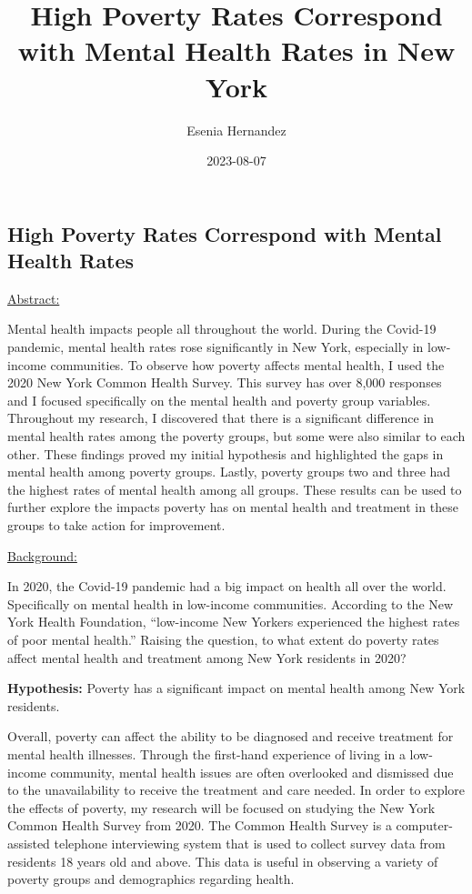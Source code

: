 \documentclass[
]{article}
\title{High Poverty Rates Correspond with Mental Health Rates in New
York}
\author{Esenia Hernandez}
\date{2023-08-07}
\begin{document}
\maketitle

\hypertarget{high-poverty-rates-correspond-with-mental-health-rates}{%
\subsection{High Poverty Rates Correspond with Mental Health
Rates}\label{high-poverty-rates-correspond-with-mental-health-rates}}

\ul{Abstract:}

Mental health impacts people all throughout the world. During the
Covid-19 pandemic, mental health rates rose significantly in New York,
especially in low-income communities. To observe how poverty affects
mental health, I used the 2020 New York Common Health Survey. This
survey has over 8,000 responses and I focused specifically on the mental
health and poverty group variables. Throughout my research, I discovered
that there is a significant difference in mental health rates among the
poverty groups, but some were also similar to each other. These findings
proved my initial hypothesis and highlighted the gaps in mental health
among poverty groups. Lastly, poverty groups two and three had the
highest rates of mental health among all groups. These results can be
used to further explore the impacts poverty has on mental health and
treatment in these groups to take action for improvement.

\ul{Background:}

In 2020, the Covid-19 pandemic had a big impact on health all over the
world. Specifically on mental health in low-income communities.
According to the New York Health Foundation, ``low-income New Yorkers
experienced the highest rates of poor mental health.'' Raising the
question, to what extent do poverty rates affect mental health and
treatment among New York residents in 2020?

\textbf{Hypothesis:} Poverty has a significant impact on mental health
among New York residents.

Overall, poverty can affect the ability to be diagnosed and receive
treatment for mental health illnesses. Through the first-hand experience
of living in a low-income community, mental health issues are often
overlooked and dismissed due to the unavailability to receive the
treatment and care needed. In order to explore the effects of poverty,
my research will be focused on studying the New York Common Health
Survey from 2020. The Common Health Survey is a computer-assisted
telephone interviewing system that is used to collect survey data from
residents 18 years old and above. This data is useful in observing a
variety of poverty groups and demographics regarding health.
\end{document}
